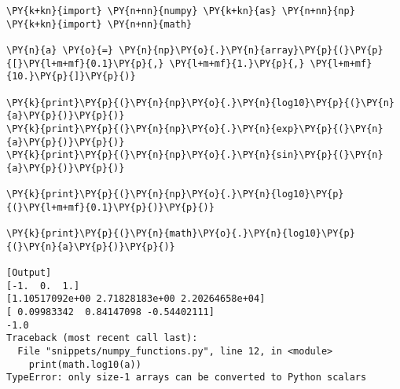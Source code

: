 \begin{Verbatim}[label=\makebox{\url{https://github.com/lucabaldini/cmepda/tree/master/slides/latex/snippets/numpy\_functions.py}},commandchars=\\\{\}]
\PY{k+kn}{import} \PY{n+nn}{numpy} \PY{k+kn}{as} \PY{n+nn}{np}
\PY{k+kn}{import} \PY{n+nn}{math}

\PY{n}{a} \PY{o}{=} \PY{n}{np}\PY{o}{.}\PY{n}{array}\PY{p}{(}\PY{p}{[}\PY{l+m+mf}{0.1}\PY{p}{,} \PY{l+m+mf}{1.}\PY{p}{,} \PY{l+m+mf}{10.}\PY{p}{]}\PY{p}{)}

\PY{k}{print}\PY{p}{(}\PY{n}{np}\PY{o}{.}\PY{n}{log10}\PY{p}{(}\PY{n}{a}\PY{p}{)}\PY{p}{)}
\PY{k}{print}\PY{p}{(}\PY{n}{np}\PY{o}{.}\PY{n}{exp}\PY{p}{(}\PY{n}{a}\PY{p}{)}\PY{p}{)}
\PY{k}{print}\PY{p}{(}\PY{n}{np}\PY{o}{.}\PY{n}{sin}\PY{p}{(}\PY{n}{a}\PY{p}{)}\PY{p}{)}

\PY{k}{print}\PY{p}{(}\PY{n}{np}\PY{o}{.}\PY{n}{log10}\PY{p}{(}\PY{l+m+mf}{0.1}\PY{p}{)}\PY{p}{)}

\PY{k}{print}\PY{p}{(}\PY{n}{math}\PY{o}{.}\PY{n}{log10}\PY{p}{(}\PY{n}{a}\PY{p}{)}\PY{p}{)}

[Output]
[-1.  0.  1.]
[1.10517092e+00 2.71828183e+00 2.20264658e+04]
[ 0.09983342  0.84147098 -0.54402111]
-1.0
Traceback (most recent call last):
  File "snippets/numpy_functions.py", line 12, in <module>
    print(math.log10(a))
TypeError: only size-1 arrays can be converted to Python scalars
\end{Verbatim}